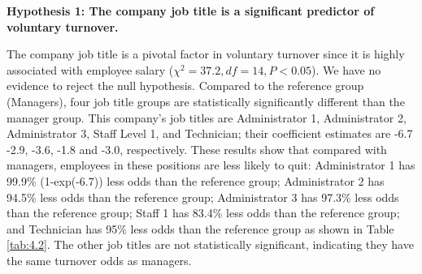 \textbf{Hypothesis 1: The company job title is a significant predictor of voluntary turnover.}

The company job title is a pivotal factor in voluntary turnover since it is highly associated with employee salary ($\chi^2=37.2, df=14, P<0.05$). We have no evidence to reject the null hypothesis. Compared to the reference group (Managers), four job title groups are statistically significantly different than the manager group. This company's job titles are Administrator 1, Administrator 2, Administrator 3, Staff Level 1, and Technician; their coefficient estimates are -6.7 -2.9, -3.6, -1.8 and -3.0, respectively. These results show that compared with managers, employees in these positions are less likely to quit: Administrator 1 has 99.9\% (1-exp(-6.7)) less odds than the reference group; Administrator 2 has 94.5\% less odds than the reference group; Administrator 3 has 97.3\% less odds than the reference group; Staff 1 has 83.4\% less odds than the reference group; and Technician has 95\% less odds than the reference group as shown in Table \ref{tab:4.2}. The other job titles are not statistically significant, indicating they have the same turnover odds as managers.
